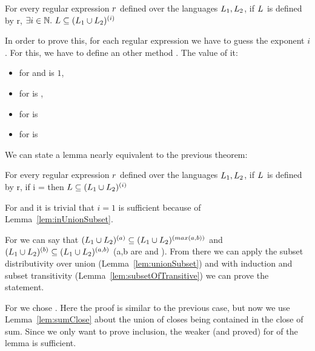 \begin{theorem}
	For every regular expression $r$ defined over the languages $L_{1}, L_{2}$, if $L_{}$ is defined by r, $\exists i \in \mathbb{N}. ~ L \subseteq (L_{1} \cup L_{2})^{(i)}$
\end{theorem}

In order to prove this, for each regular expression we have to guess the exponent $i$. For this, we have to define an other method . The value of it:

\begin{itemize}
	\item for  and  is $1$,
	\item for  is ,
	\item for  is  
	\item for  is  
\end{itemize}

We can state a lemma nearly equivalent to the previous theorem:
\begin{lemma}
	\label{lem:regexSubsetStar}
	For every regular expression $r$ defined over the languages $L_{1}, L_{2}$, if $L_{}$ is defined by r, if i =  then $L \subseteq (L_{1} \cup L_{2})^{(i)}$
\end{lemma}

For  and  it is trivial that $i=1$ is sufficient because of Lemma~\ref{lem:inUnionSubset}.

For  we can say that $(L_{1} \cup L_{2})^{(a)} \subseteq (L_{1} \cup L_{2})^{(max(a,b))}$ and $(L_{1} \cup L_{2})^{(b)} \subseteq (L_{1} \cup L_{2})^{(a,b)}$ (a,b are  and ). From there we can apply the subset distributivity over union (Lemma~\ref{lem:unionSubset}) and with induction and subset transitivity (Lemma~\ref{lem:subsetOfTransitive}) we can prove the statement.

For  we chose . Here the proof is similar to the previous case, but now we use Lemma~\ref{lem:sumClose} about the union of closes being contained in the close of sum. Since we only want to prove inclusion, the weaker (and proved) for of the lemma is sufficient.

